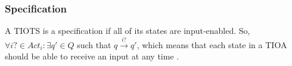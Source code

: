 \subsubsection{Specification}
A TIOTS is a specification if all of its states are input-enabled. So, $\forall i? \in Act_i : \exists q' \in Q$ such that $q \xrightarrow{i?} q'$, which means that each state in a TIOA should be able to receive an input at any time \cite{ecdartheory}.